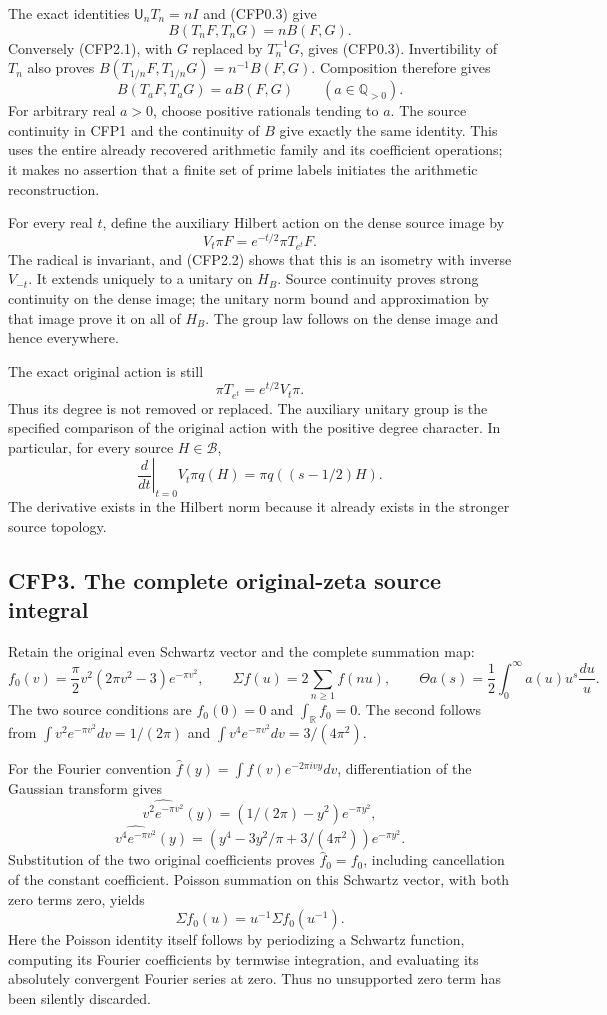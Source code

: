 The exact identities \(\mathsf U_nT_n=nI\) and (CFP0.3) give \[
B(T_nF,T_nG)=nB(F,G).
\tag{CFP2.1}
\] Conversely (CFP2.1), with \(G\) replaced by \(T_n^{-1}G\), gives
(CFP0.3). Invertibility of \(T_n\) also proves
\(B(T_{1/n}F,T_{1/n}G)=n^{-1}B(F,G)\). Composition therefore gives \[
B(T_aF,T_aG)=aB(F,G)\qquad(a\in\mathbb Q_{>0}).
\tag{CFP2.2}
\] For arbitrary real \(a>0\), choose positive rationals tending to
\(a\). The source continuity in CFP1 and the continuity of \(B\) give
exactly the same identity. This uses the entire already recovered
arithmetic family and its coefficient operations; it makes no assertion
that a finite set of prime labels initiates the arithmetic
reconstruction.

For every real \(t\), define the auxiliary Hilbert action on the dense
source image by \[
V_t\pi F=e^{-t/2}\pi T_{e^t}F.
\tag{CFP2.3}
\] The radical is invariant, and (CFP2.2) shows that this is an isometry
with inverse \(V_{-t}\). It extends uniquely to a unitary on \(H_B\).
Source continuity proves strong continuity on the dense image; the
unitary norm bound and approximation by that image prove it on all of
\(H_B\). The group law follows on the dense image and hence everywhere.

The exact original action is still \[
\boxed{\pi T_{e^t}=e^{t/2}V_t\pi.}
\tag{CFP2.4}
\] Thus its degree is not removed or replaced. The auxiliary unitary
group is the specified comparison of the original action with the
positive degree character. In particular, for every source
\(H\in\mathcal B\), \[
\left.\frac d{dt}\right|_{t=0}V_t\pi q(H)
=\pi q((s-1/2)H).
\tag{CFP2.5}
\] The derivative exists in the Hilbert norm because it already exists
in the stronger source topology.

\subsection{CFP3. The complete original-zeta source
integral}\label{cfp3.-the-complete-original-zeta-source-integral}

Retain the original even Schwartz vector and the complete summation map:
\[
f_0(v)=\frac\pi2v^2(2\pi v^2-3)e^{-\pi v^2},\qquad
\Sigma f(u)=2\sum_{n\ge1}f(nu),\qquad
\Theta a(s)=\frac12\int_0^\infty a(u)u^s\frac{du}{u}.
\tag{CFP3.1}
\] The two source conditions are \(f_0(0)=0\) and
\(\int_{\mathbb R}f_0=0\). The second follows from
\(\int v^2e^{-\pi v^2}dv=1/(2\pi)\) and
\(\int v^4e^{-\pi v^2}dv=3/(4\pi^2)\).

For the Fourier convention \(\widehat f(y)=\int f(v)e^{-2\pi ivy}dv\),
differentiation of the Gaussian transform gives \[
\widehat{v^2e^{-\pi v^2}}(y)
=(1/(2\pi)-y^2)e^{-\pi y^2},
\] \[
\widehat{v^4e^{-\pi v^2}}(y)
=(y^4-3y^2/\pi+3/(4\pi^2))e^{-\pi y^2}.
\tag{CFP3.2}
\] Substitution of the two original coefficients proves
\(\widehat f_0=f_0\), including cancellation of the constant
coefficient. Poisson summation on this Schwartz vector, with both zero
terms zero, yields \[
\Sigma f_0(u)=u^{-1}\Sigma f_0(u^{-1}).
\tag{CFP3.3}
\] Here the Poisson identity itself follows by periodizing a Schwartz
function, computing its Fourier coefficients by termwise integration,
and evaluating its absolutely convergent Fourier series at zero. Thus no
unsupported zero term has been silently discarded.

